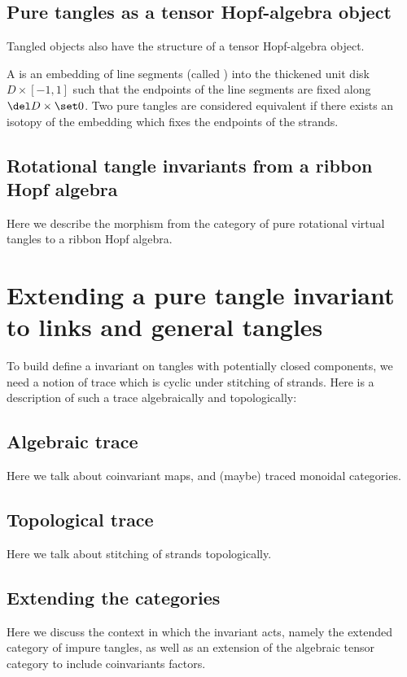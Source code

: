 \documentclass{article}
\begin{document}
\subsection{Pure tangles as a tensor Hopf-algebra object}
\label{sec:topological_interpretations}

Tangled objects also have the structure of a tensor Hopf-algebra object.

\begin{definition}
        A  is an embedding of line segments (called
        ) into the thickened unit disk $D \times [-1,1]$ such that
        the endpoints of the line segments are fixed along $\del D \times
        \set0$. Two pure tangles are considered equivalent if there exists an
        isotopy of the embedding which fixes the endpoints of the strands.
\end{definition}

\subsection{Rotational tangle invariants from a ribbon Hopf algebra}
Here we describe the morphism from the category of pure rotational virtual
tangles to a ribbon Hopf algebra.

\section{Extending a pure tangle invariant to links and general tangles}
To build define a invariant on tangles with potentially closed components, we
need a notion of trace which is cyclic under stitching of strands. Here is a
description of such a trace algebraically and topologically:

\subsection{Algebraic trace}
Here we talk about coinvariant maps, and (maybe) traced monoidal categories.

\subsection{Topological trace}
Here we talk about stitching of strands topologically.

\subsection{Extending the categories}
Here we discuss the context in which the invariant acts, namely the extended
category of impure tangles, as well as an extension of the algebraic tensor
category to include coinvariants factors.
\end{document}
